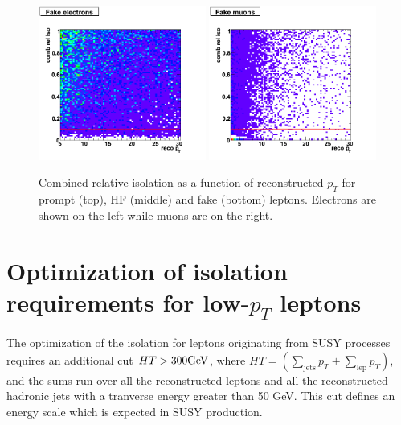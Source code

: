 \documentclass{cmspaper}
\begin{document}
\begin{figure}[htbp]
   \includegraphics[width = 0.49\textwidth]{pictures/recoPt_relIso/combIso_elec_fake.png}
   \includegraphics[width = 0.49\textwidth]{pictures/recoPt_relIso/combIso_muon_fake.png}
   \caption{\small{Combined relative isolation as a function of reconstructed $p_T$ for prompt
(top), HF (middle) and fake (bottom) leptons. Electrons are shown on the left while muons are on the right.}
   \label{fig:recoPt_combRelIso_prompt}}
\end{figure}




\section{Optimization of isolation requirements for low-$p_T$ leptons}
\label{sec:softLepIsoOpt}
The optimization of the isolation for
leptons originating from SUSY processes requires
an additional cut $HT > 300 {\rm GeV}$, where
$HT =\left(\sum_{\textrm{jets}}p_T + \sum_{\textrm{lep}}p_T \right) $, and the sums run over all the reconstructed leptons and all the reconstructed
hadronic jets with a tranverse energy greater than 50 GeV.
This cut
defines an energy scale which is expected in SUSY production.
\end{document}
